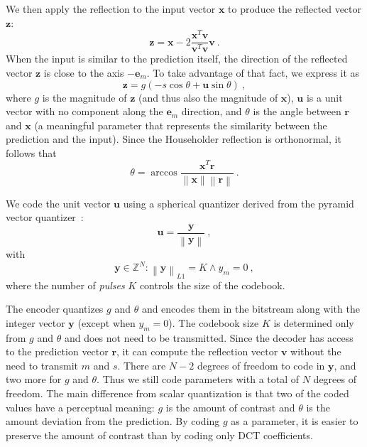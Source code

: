 \documentclass[english,conference,10pt]{IEEEtran}
\begin{document}
We then apply the reflection to the input vector
$\mathbf{x}$ to produce the reflected vector $\mathbf{z}$:
\begin{equation}
\mathbf{z} = \mathbf{x} - 2\frac{\mathbf{x}^T\mathbf{v}}
{\mathbf{v}^T\mathbf{v}}\mathbf{v}\ .
\end{equation}
When the input is similar to the prediction itself, the direction of the
reflected vector $\mathbf{z}$ is close to the axis $-\mathbf{e}_m$. To take
advantage of that fact, we express it as
\begin{equation}
\mathbf{z} = g\left(-s\cos\theta + \mathbf{u}\sin\theta\right)\ ,
\end{equation}
where $g$ is the magnitude of $\mathbf{z}$ (and thus also the magnitude of
$\mathbf{x}$), $\mathbf{u}$ is a unit vector with no component along the
$\mathbf{e}_m$ direction, and $\theta$ is the angle between $\mathbf{r}$ and
$\mathbf{x}$ (a meaningful parameter that represents the similarity between
the prediction and the input). Since the Householder reflection is orthonormal,
it follows that
\begin{equation}
\theta = \arccos\frac{\mathbf{x}^T\mathbf{r}}
                   {\left\|\mathbf{x}\right\|\left\|\mathbf{r}\right\|}\ .
\end{equation}

We code the unit vector $\mathbf{u}$ using a spherical quantizer derived
from the pyramid vector quantizer~\cite{Fischer1986}:
\begin{equation}
\mathbf{u}=\frac{\mathbf{y}}{\left\|\mathbf{y}\right\|}\ ,
\end{equation}
with
\begin{equation}
\mathbf{y} \in \mathbb{Z}^N : \left\|\mathbf{y}\right\|_{L1} = K \land y_m=0\ ,
\end{equation}
where the number of \textit{pulses} $K$ controls the size of the codebook.

The encoder quantizes $g$ and $\theta$ and encodes them in the bitstream along
with the integer vector $\mathbf{y}$ (except when $y_m=0$). The codebook
size $K$ is determined only from $g$ and $\theta$ and does not need to be
transmitted. Since the decoder has access to the prediction vector $\mathbf{r}$,
it can compute the reflection vector $\mathbf{v}$ without the need to transmit
$m$ and $s$. There are $N-2$ degrees of freedom to code in
$\mathbf{y}$, and two more for $g$ and $\theta$. Thus we still code parameters
with a total of $N$ degrees of freedom. The main difference from scalar
quantization is that two of the
coded values have a perceptual meaning: $g$ is the amount of contrast and
$\theta$ is the amount deviation from the prediction. By coding $g$
as a parameter, it is easier to preserve the amount of contrast than by
coding only DCT coefficients.
\end{document}
